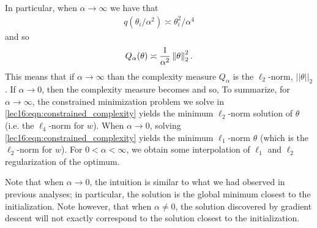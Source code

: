 \begin{remark}
In particular, when $\alpha \to \infty$ we have that 
\begin{align}
    q(\theta_i /\alpha^2) \asymp \theta_i^2/\alpha^4
\end{align}
and so 
\begin{align}
    Q_\alpha(\theta) \asymp \frac{1}{\alpha^2} \left\|\theta\right\|_2^2.
\end{align}
This means that if $\alpha \to \infty$ than the complexity measure $Q_\alpha$ is the $\ell_2$-norm, $||\theta||_2$.  If $\alpha \to 0$, then the complexity measure becomes
and so,
To summarize, for $\alpha \to \infty$, the constrained minimization problem we solve in \eqref{lec16:eqn:constrained_complexity} yields the minimum $\ell_2$-norm solution of $\theta$ (i.e. the $\ell_4$-norm for $w$).  When $\alpha \to 0$, solving \eqref{lec16:eqn:constrained_complexity} yields the minimum $\ell_1$-norm $\theta$ (which is the $\ell_2$-norm for $w$).  For $0 < \alpha < \infty$, we obtain some interpolation of $\ell_1$ and $\ell_2$ regularization of the optimum.
\end{remark}

\begin{remark}
Note that when $\alpha \to 0$, the intuition is similar to what we had observed in previous analyses; in particular, the solution is the global minimum closest to the initialization.  Note however, that when $\alpha \neq 0$, the solution discovered by gradient descent will not exactly correspond to the solution closest to the initialization.
\end{remark}

